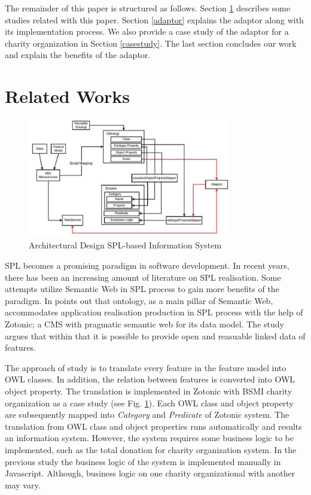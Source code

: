 \documentclass[conference]{IEEEtran}
\begin{document}
The remainder of this paper is structured as follows. Section \ref{relatedworks} describes some studies related with this paper. Section \ref{adaptor} explains the adaptor along with its implementation process. We also provide a case study of the adaptor for a charity organization in Section \ref{casestudy}. The last section concludes our work and explain the benefits of the adaptor. 

\section{Related Works} \label{relatedworks}

\begin{figure}[h]
\centering
\includegraphics[width=3.5in]{overallsysdes}

\caption{Architectural Design SPL-based Information System}
\label{fig_sysdes}
\end{figure}

SPL becomes a promising paradigm in software development. In recent years, there has been an increasing amount of literature on SPL realisation. Some attempts utilize Semantic Web in SPL process to gain more benefits of the paradigm. In \cite{fmontology} points out that ontology, as a main pillar of Semantic Web, accommodates application realisation production in SPL process with the help of Zotonic; a CMS with pragmatic semantic web for its data model. The study argues that within that it is possible to provide open and reasuable linked data of features.

The approach of study \cite{fmontology} is to translate every feature in the feature model into OWL classes. In addition, the relation between features is converted into OWL object property. The translation is implemented in Zotonic with BSMI charity organization as a case study (see Fig. \ref{fig_sysdes}). Each OWL class and object property are subsequently mapped into \textit{Category} and \textit{Predicate} of Zotonic system. The translation from OWL class and object properties runs automatically and results an information system. However, the system requires some business logic to be implemented, such as the total donation for charity organization system. In the previous study \cite{bravyto} the business logic of the system is implemented manually in Javascript. Although, business logic on one charity organizational with another may vary. 
\end{document}
